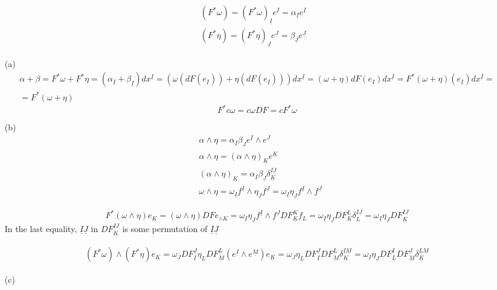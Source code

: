 \[
\begin{aligned}
  & (F^* \omega)  = (F^* \omega)_{\underline{I}} e^{\underline{I}} = \alpha_{\underline{I}} e^{ \underline{I}} \\ 
  &  (F^* \eta) = (F^* \eta)_{\underline{J}} e^{ \underline{J}} = \beta_{\underline{J}} e^{\underline{J}}
\end{aligned}
\]
\begin{enumerate}
\item[(a)] \[
\begin{gathered}
  \alpha + \beta  = F^* \omega + F^*\eta = (\alpha_{\underline{I}} + \beta_{\underline{I}} ) dx^{\underline{I}} = (\omega(dF(e_{\underline{I}} ) ) + \eta( dF(e_{\underline{I}})) )dx^{\underline{I}} = (\omega+ \eta) dF(e_I) dx^{\underline{I}} = F^*(\omega + \eta)(e_{\underline{I}})dx^{\underline{I}} = \\
  = F^*(\omega+ \eta)
\end{gathered}
\]
\[
F^*c\omega = c \omega DF = c F^*\omega
\]
\item[(b)] \[
\begin{aligned}
  & \alpha \wedge \eta = \alpha_{\underline{I}} \beta_{\underline{J}} e^{ \underline{I}} \wedge e^{ \underline{J}} \\
  & \alpha \wedge \eta = (\alpha \wedge \eta)_{\underline{K}} e^{ \underline{K}}  \\
  & (\alpha \wedge \eta)_{\underline{K}} = \alpha_{\underline{I}} \beta_{\underline{J}} \delta^{ \underline{I} \underline{J}}_{ \underline{K}}  \\
& \omega \wedge \eta = \omega_{\underline{I}} f^{\underline{I}} \wedge \eta_{\underline{J}} f^{\underline{J}} = \omega_{\underline{I}} \eta_{\underline{J}} f^{\underline{I}} \wedge f^{\underline{J}}
\end{aligned}
\]

\[
F^*(\omega \wedge \eta) e_{\underline{K}} = (\omega \wedge \eta) DF e_{\wedge{K}} = \omega_{\underline{I}} \eta_{\underline{J}} f^{ \underline{I}} \wedge f^{\underline{J}} DF^K_{ \underline{K}} f_L = \omega_{\underline{I}} \eta_{\underline{J}} DF^L_{\underline{K}} \delta^{ \underline{I} \underline{J}}_L = \omega_{\underline{I}} \eta_{\underline{J}} DF^{ \underline{I}\underline{J}}_{\underline{K}}
\]
In the last equality, $\underline{I} \underline{J}$ in $DF^{\underline{I}\underline{J}}_{\underline{K}}$ is some permutation of $\underline{I}\underline{J}$


\[
\begin{gathered}
  (F^*\omega) \wedge (F^* \eta) e_{\underline{K}} = \omega_{\underline{J}} DF^{\underline{J}}_{\underline{I}} \eta_{\underline{L}} DF^{\underline{L}}_{ \underline{M}} (e^{\underline{I}} \wedge e^{\underline{M}} ) e_{\underline{K}} = \omega_{\underline{J}} \eta_{\underline{L}} DF^{\underline{J}}_{\underline{I}} DF^{\underline{L}}_{\underline{M}} \delta^{\underline{I}\underline{M}}_{\underline{K}}     = \omega_{\underline{I}} \eta_{\underline{J}} DF^{\underline{I}}_{\underline{L}} DF^{\underline{J}}_{\underline{M}} \delta^{\underline{L} \underline{M}}_{\underline{K}}
\end{gathered}
\]
\item[(c)]
\end{enumerate}


